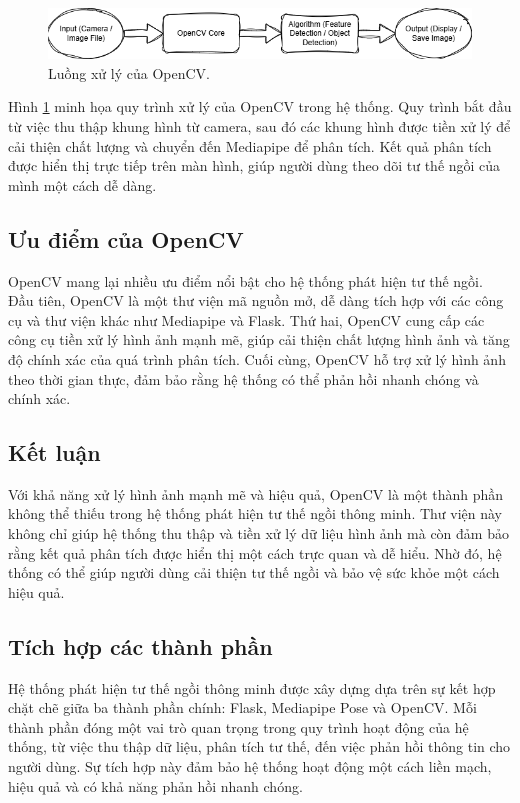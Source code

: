 \documentclass[conference]{IEEEtran}
\begin{document}
\begin{figure}[H]
    \centering
    \includegraphics[width=0.9\linewidth]{images/opencv_workflow.png}
    \caption{Luồng xử lý của OpenCV.}
    \label{fig:opencv_workflow}
\end{figure}

Hình \ref{fig:opencv_workflow} minh họa quy trình xử lý của OpenCV trong hệ thống. Quy trình bắt đầu từ việc thu thập khung hình từ camera, sau đó các khung hình được tiền xử lý để cải thiện chất lượng và chuyển đến Mediapipe để phân tích. Kết quả phân tích được hiển thị trực tiếp trên màn hình, giúp người dùng theo dõi tư thế ngồi của mình một cách dễ dàng.

\subsection{Ưu điểm của OpenCV}
OpenCV mang lại nhiều ưu điểm nổi bật cho hệ thống phát hiện tư thế ngồi. Đầu tiên, OpenCV là một thư viện mã nguồn mở, dễ dàng tích hợp với các công cụ và thư viện khác như Mediapipe và Flask. Thứ hai, OpenCV cung cấp các công cụ tiền xử lý hình ảnh mạnh mẽ, giúp cải thiện chất lượng hình ảnh và tăng độ chính xác của quá trình phân tích. Cuối cùng, OpenCV hỗ trợ xử lý hình ảnh theo thời gian thực, đảm bảo rằng hệ thống có thể phản hồi nhanh chóng và chính xác.

\subsection{Kết luận}
Với khả năng xử lý hình ảnh mạnh mẽ và hiệu quả, OpenCV là một thành phần không thể thiếu trong hệ thống phát hiện tư thế ngồi thông minh. Thư viện này không chỉ giúp hệ thống thu thập và tiền xử lý dữ liệu hình ảnh mà còn đảm bảo rằng kết quả phân tích được hiển thị một cách trực quan và dễ hiểu. Nhờ đó, hệ thống có thể giúp người dùng cải thiện tư thế ngồi và bảo vệ sức khỏe một cách hiệu quả.

\subsection{Tích hợp các thành phần}
Hệ thống phát hiện tư thế ngồi thông minh được xây dựng dựa trên sự kết hợp chặt chẽ giữa ba thành phần chính: Flask, Mediapipe Pose và OpenCV. Mỗi thành phần đóng một vai trò quan trọng trong quy trình hoạt động của hệ thống, từ việc thu thập dữ liệu, phân tích tư thế, đến việc phản hồi thông tin cho người dùng. Sự tích hợp này đảm bảo hệ thống hoạt động một cách liền mạch, hiệu quả và có khả năng phản hồi nhanh chóng.
\end{document}
